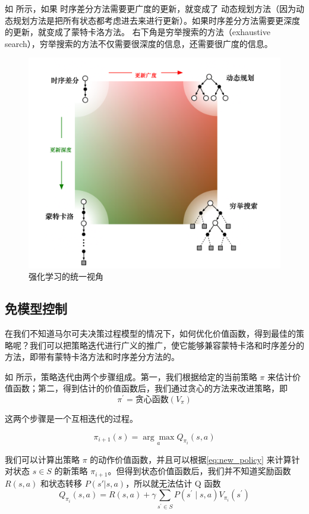 如 所示，如果 时序差分方法需要更广度的更新，就变成了 动态规划方法（因为动态规划方法是把所有状态都考虑进去来进行更新）。如果时序差分方法需要更深度的更新，就变成了蒙特卡洛方法。 右下角是穷举搜索的方法（exhaustive search），穷举搜索的方法不仅需要很深度的信息，还需要很广度的信息。

\begin{figure}[htb]
	\centering
	\includegraphics[width=0.4\linewidth]{res/ch3/comparison_5}
	\caption{强化学习的统一视角}
	\label{fig:rl_view}
\end{figure}

\subsection{免模型控制} 
在我们不知道马尔可夫决策过程模型的情况下，如何优化价值函数，得到最佳的策略呢？我们可以把策略迭代进行广义的推广，使它能够兼容蒙特卡洛和时序差分的方法，即带有蒙特卡洛方法和时序差分方法的。


如 所示，策略迭代由两个步骤组成。第一，我们根据给定的当前策略 $\pi$ 来估计价值函数；第二，得到估计的价值函数后，我们通过贪心的方法来改进策略，即
	\begin{equation}
		\label{eq:}
		\pi^{'}=\text{贪心函数}(V_{\pi})
	\end{equation}
	
这两个步骤是一个互相迭代的过程。

\begin{equation}
	\label{eq:new_policy}
	\pi_{i+1}(s)=\underset{a}{\arg \max } Q_{\pi_{i}}(s, a)
\end{equation}

我们可以计算出策略 $\pi$ 的动作价值函数，并且可以根据\eqref{eq:new_policy} 来计算针对状态 $s \in S$ 的新策略 $\pi_{i+1}$。但得到状态价值函数后，我们并不知道奖励函数 $R(s,a)$ 和状态转移 $P(s'|s,a)$，所以就无法估计 Q 函数
\begin{equation}
	\label{eq:Q_compute}
	Q_{\pi_{i}}(s, a)=R(s, a)+\gamma \sum_{s^{\prime} \in S} P\left(s^{\prime} \mid s, a\right) V_{\pi_{i}}\left(s^{\prime}\right)
\end{equation}

